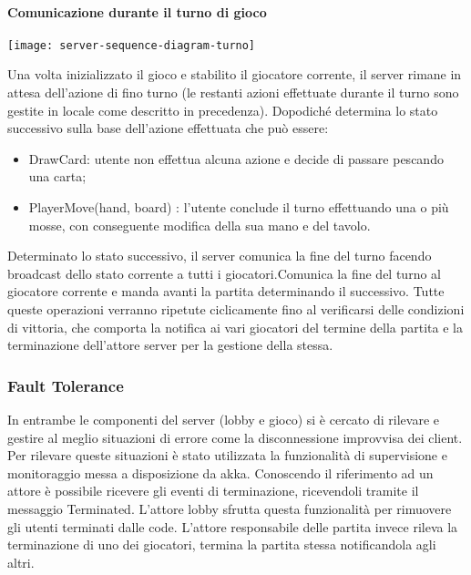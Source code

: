 \paragraph{Comunicazione durante il turno di gioco}
\begin{center}
    \texttt{[image: server-sequence-diagram-turno]}
\end{center}
Una volta inizializzato il gioco e stabilito il giocatore corrente, il server rimane in attesa dell’azione di fino turno (le restanti azioni effettuate durante il turno sono gestite in locale come descritto in precedenza).
Dopodiché determina lo stato successivo sulla base dell’azione effettuata che può essere:
\begin{itemize}
    \item DrawCard: utente non effettua alcuna azione e decide di passare pescando una carta;
    \item PlayerMove(hand, board) : l’utente conclude il turno effettuando una o più mosse, con conseguente modifica della sua mano e del tavolo.
\end{itemize}
Determinato lo stato successivo, il server comunica la fine del turno facendo broadcast dello stato corrente a tutti i giocatori.Comunica la fine del turno al giocatore corrente e manda avanti la partita determinando il successivo.
\newline
Tutte queste operazioni verranno ripetute ciclicamente fino al verificarsi delle condizioni di vittoria, che comporta la notifica ai vari giocatori del termine della partita e la terminazione dell’attore server per la gestione della stessa.

\subsubsection{Fault Tolerance}
In entrambe le componenti del server (lobby e gioco) si è cercato di rilevare e gestire al meglio situazioni di errore come la disconnessione improvvisa dei client.
Per rilevare queste situazioni è stato utilizzata la funzionalità di supervisione e monitoraggio messa a disposizione da akka.\newline
Conoscendo il riferimento ad un attore è possibile ricevere gli eventi di terminazione, ricevendoli tramite il messaggio Terminated.\newline
L’attore lobby sfrutta questa funzionalità per rimuovere gli utenti terminati dalle code.
L’attore responsabile delle partita invece rileva la terminazione di uno dei giocatori, termina la partita stessa notificandola agli altri.

